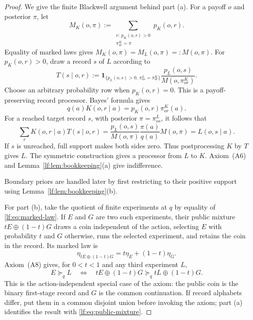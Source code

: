 \documentclass[11pt,a4paper]{article}
\theoremstyle{definition}
\newcommand{\1}{\mathbf 1}
\begin{document}
\begin{proof}
We give the finite Blackwell argument behind part \textup{(a)}.  For a payoff
$o$ and posterior $\pi$, let
\[
M_K(o,\pi):=
\sum_{\substack{r:\,p_K(o,r)>0\\ \pi^K_{or}=\pi}} p_K(o,r).
\]
Equality of marked laws gives $M_K(o,\pi)=M_L(o,\pi)=:M(o,\pi)$.
For $p_K(o,r)>0$, draw a record $s$ of $L$ according to
\begin{equation}
T(s\mid o,r):=
\1_{\{p_L(o,s)>0,\,\pi^L_{os}=\pi^K_{or}\}}
\frac{p_L(o,s)}{M(o,\pi^K_{or})}.
\label{lf:eq:matching-processor}
\end{equation}
Choose an arbitrary probability row when $p_K(o,r)=0$.  This is a
payoff-preserving record processor.  Bayes' formula gives
\[
q(a)K(o,r\mid a)=p_K(o,r)\pi^K_{or}(a).
\]
For a reached target record $s$, with posterior $\pi=\pi^L_{os}$, it follows
that
\[
\sum_r K(o,r\mid a)T(s\mid o,r)
=\frac{p_L(o,s)}{M(o,\pi)}
  \frac{\pi(a)}{q(a)}M(o,\pi)
=L(o,s\mid a).
\]
If $s$ is unreached, full support makes both sides zero.  Thus postprocessing
$K$ by $T$ gives $L$.  The symmetric construction gives a
processor from $L$ to $K$.  Axiom~\textup{(A6)} and
Lemma~\ref{lf:lem:bookkeeping}\textup{(a)} give indifference.

Boundary priors are handled later by first restricting to their positive
support using Lemma~\ref{lf:lem:bookkeeping}\textup{(b)}.

For part \textup{(b)}, take the quotient of finite experiments at $q$ by
equality of \eqref{lf:eq:marked-law}.  If $E$ and $G$ are two such experiments,
their public mixture $tE\oplus(1-t)G$ draws a coin independent of the action,
selecting $E$ with probability $t$ and $G$ otherwise, runs the selected
experiment, and retains the coin in the record.  Its marked law is
\begin{equation}
\eta_{tE\oplus(1-t)G}=t\eta_E+(1-t)\eta_G.
\label{lf:eq:public-mixture}
\end{equation}
Axiom~\textup{(A8)} gives, for $0<t<1$ and any third experiment $L$,
\begin{equation}
E\succeq_q L
\quad\Longleftrightarrow\quad
tE\oplus(1-t)G\succeq_q tL\oplus(1-t)G.
\label{lf:eq:mixture-independence}
\end{equation}
This is the action-independent special case of the axiom: the public coin is the binary first-stage record and
$G$ is the common continuation.  If record alphabets differ, put them in a common disjoint union before invoking
the axiom; part \textup{(a)} identifies the result with
\eqref{lf:eq:public-mixture}.


\end{proof}
\end{document}
